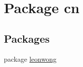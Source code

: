 \hypertarget{namespacecn}{}\section{Package cn}
\label{namespacecn}
\subsection*{Packages}
\begin{DoxyCompactItemize}
\item 
package \hyperlink{namespacecn_1_1leonwong}{leonwong}
\end{DoxyCompactItemize}
